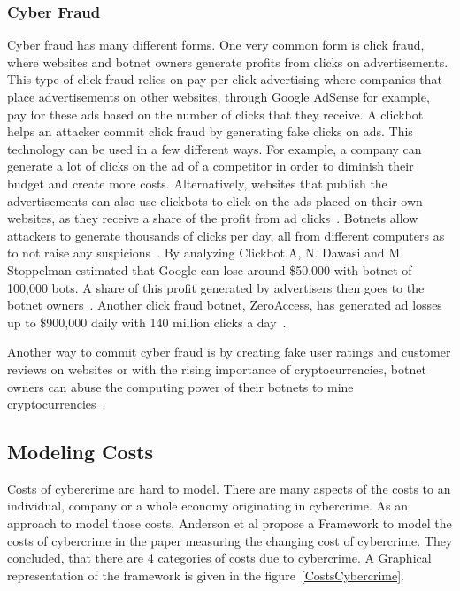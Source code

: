 \subsubsection{Cyber Fraud}
Cyber fraud has many different forms.
One very common form is click fraud, where websites and botnet owners generate profits from clicks on advertisements.
This type of click fraud relies on pay-per-click advertising where companies that place advertisements on other websites, through Google AdSense for example, pay for these ads based on the number of clicks that they receive.
A clickbot helps an attacker commit click fraud by generating fake clicks on ads.
This technology can be used in a few different ways.
For example, a company can generate a lot of clicks on the ad of a competitor in order to diminish their budget and create more costs.
Alternatively, websites that publish the advertisements can also use clickbots to click on the ads placed on their own websites, as they receive a share of the profit from ad clicks~\cite{Daswani07}.
Botnets allow attackers to generate thousands of clicks per day, all from different computers as to not raise any suspicions~\cite{Namestnikov09}.
By analyzing Clickbot.A, N. Dawasi and M. Stoppelman estimated that Google can lose around \$50,000 with botnet of 100,000 bots.
A share of this profit generated by advertisers then goes to the botnet owners~\cite{Daswani07}.
Another click fraud botnet, ZeroAccess, has generated ad losses up to \$900,000 daily with 140 million clicks a day~\cite{Bottazzi14}.

Another way to commit cyber fraud is by creating fake user ratings and customer reviews on websites or with the rising importance of cryptocurrencies, botnet owners can abuse the computing power of their botnets to mine cryptocurrencies~\cite{Putman}.

\subsection{Modeling Costs}
Costs of cybercrime are hard to model.
There are many aspects of the costs to an individual, company or a whole economy originating in cybercrime.
As an approach to model those costs, Anderson et al propose a Framework to model the costs of cybercrime in the paper measuring the changing cost of cybercrime.
They concluded, that there are 4 categories of costs due to cybercrime.
A Graphical representation of the framework is given in the figure~\ref{CostsCybercrime}.\cite{Anderson19}

